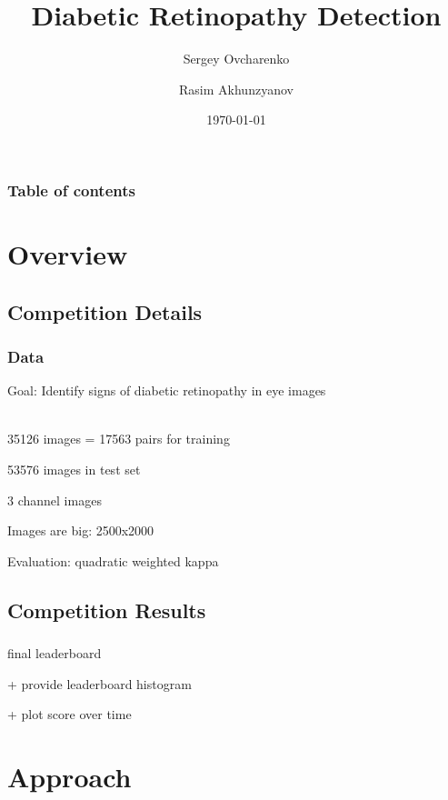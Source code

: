\documentclass{beamer}
\begin{document}
\title{Diabetic Retinopathy Detection}
\subtitle{}  
\author[]{Sergey Ovcharenko  \and Rasim Akhunzyanov }

\date{\today} 

\begin{frame}
\titlepage
\end{frame}

\begin{frame}
\frametitle{Table of contents}\tableofcontents
\end{frame} 


\section{Overview} 

\subsection{Competition Details}
\begin{frame}\frametitle{Data} 
\par Goal: Identify signs of diabetic retinopathy in eye images \\~\\
\par 35126 images = 17563 pairs for training
\par 53576 images in test set
\par 3 channel images
\par Images are big: 2500x2000
\par Evaluation: quadratic weighted kappa
\end{frame}

\subsection{Competition Results}
\begin{frame}\frametitle{} 
\par final leaderboard
\par + provide leaderboard histogram
\par + plot score over time
\end{frame}


\section{Approach} 
\end{document}

